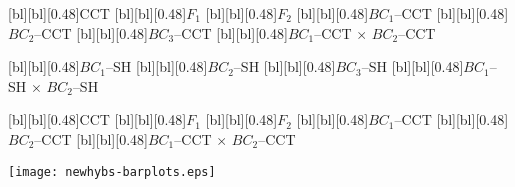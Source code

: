 \documentclass[11pt]{article}
\begin{document}
\pagestyle{empty}

\begin{center}
[bl][bl][0.48]{CCT}
[bl][bl][0.48]{$F_1$}
[bl][bl][0.48]{$F_2$}
[bl][bl][0.48]{$BC_1$--CCT}
[bl][bl][0.48]{$BC_2$--CCT}
[bl][bl][0.48]{$BC_3$--CCT}
[bl][bl][0.48]{$BC_1$--CCT $\times$ $BC_2$--CCT}

[bl][bl][0.48]{$BC_1$--SH}
[bl][bl][0.48]{$BC_2$--SH}
[bl][bl][0.48]{$BC_3$--SH}
[bl][bl][0.48]{$BC_1$--SH $\times$ $BC_2$--SH}


[bl][bl][0.48]{CCT}
[bl][bl][0.48]{$F_1$}
[bl][bl][0.48]{$F_2$}
[bl][bl][0.48]{$BC_1$--CCT}
[bl][bl][0.48]{$BC_2$--CCT}
[bl][bl][0.48]{$BC_1$--CCT $\times$ $BC_2$--CCT}


\texttt{[image: newhybs-barplots.eps]}

\end{center}




 
\end{document}
